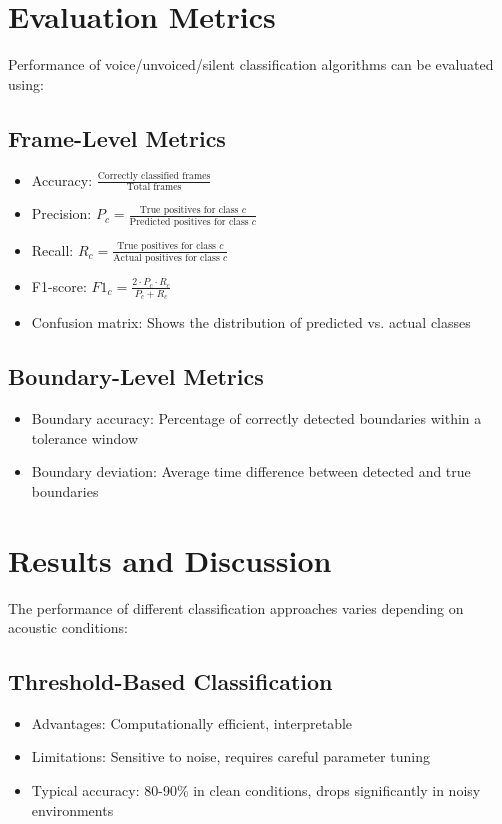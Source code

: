 \documentclass[10pt,journal,compsoc]{IEEEtran}
\begin{document}
\section{Evaluation Metrics}
Performance of voice/unvoiced/silent classification algorithms can be evaluated using:

\subsection{Frame-Level Metrics}
\begin{itemize}
    \item Accuracy: $\frac{\text{Correctly classified frames}}{\text{Total frames}}$
    \item Precision: $P_c = \frac{\text{True positives for class $c$}}{\text{Predicted positives for class $c$}}$
    \item Recall: $R_c = \frac{\text{True positives for class $c$}}{\text{Actual positives for class $c$}}$
    \item F1-score: $F1_c = \frac{2 \cdot P_c \cdot R_c}{P_c + R_c}$
    \item Confusion matrix: Shows the distribution of predicted vs. actual classes
\end{itemize}

\subsection{Boundary-Level Metrics}
\begin{itemize}
    \item Boundary accuracy: Percentage of correctly detected boundaries within a tolerance window
    \item Boundary deviation: Average time difference between detected and true boundaries
\end{itemize}

\section{Results and Discussion}
The performance of different classification approaches varies depending on acoustic conditions:

\subsection{Threshold-Based Classification}
\begin{itemize}
    \item Advantages: Computationally efficient, interpretable
    \item Limitations: Sensitive to noise, requires careful parameter tuning
    \item Typical accuracy: 80-90\% in clean conditions, drops significantly in noisy environments
\end{itemize}
\end{document}
